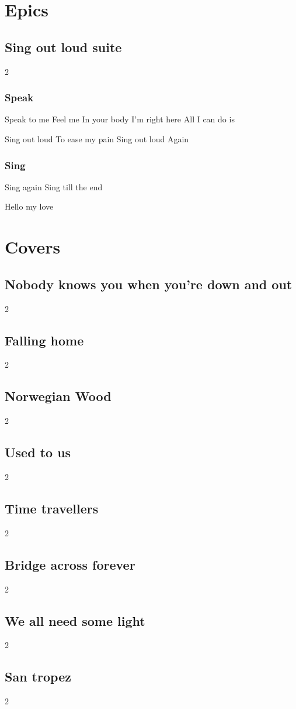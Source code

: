 \documentclass{article}
\newenvironment{album}[1]%
{%
  \section*{#1}
}%
{%
}
\newenvironment{song}[1]%
{%
  \subsection*{\textbf{#1}}
  \begin{multicols*}{2}
}%
{%
  \end{multicols*}
  \newpage
}
\newenvironment{partie}[1]%
{%
  \subsubsection{#1}
}%
{%
}
\newenvironment{couplet} %
{%
  \verbatim
}%
{% end code
  \endverbatim
}
\newenvironment{refrain} %
{%
  \verbatim
}%
{% end code
  \endverbatim
}
\begin{document}
\begin{album}{Epics}
\begin{song}{Sing out loud suite}
\begin{partie}{Speak}
\begin{couplet}
Speak to me
Feel me
In your body
I'm right here
All I can do is  
\end{couplet}
\begin{refrain}
Sing out loud
To ease my pain
Sing out loud
Again  
\end{refrain}
\end{partie}  
\begin{partie}{Sing}
\begin{refrain}
Sing again
Sing till the end  
\end{refrain}
\begin{couplet}
Hello my love  
\end{couplet}
\end{partie}  
\end{song}
\end{album}


\begin{album}{Covers}
\begin{song}{Nobody knows you when you're down and out}
\end{song}
\begin{song}{Falling home}  
\end{song}
\begin{song}{Norwegian Wood}
\end{song}
\begin{song}{Used to us}
\end{song}
\begin{song}{Time travellers}
\end{song}
\begin{song}{Bridge across forever}
\end{song}
\begin{song}{We all need some light}
\end{song}
\begin{song}{San tropez}
\end{song}
\end{album}
\end{document}
